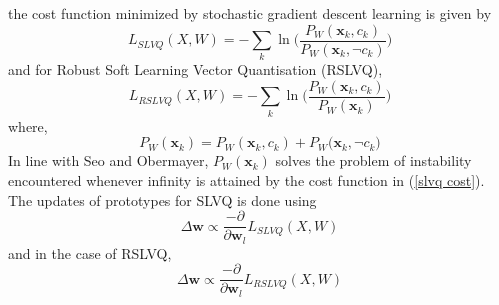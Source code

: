 the cost function minimized by stochastic gradient descent learning is given by
\begin{equation}\label{slvq cost}
	L_{SLVQ}(X,W) = -\sum_{k}\ln\bigg(\frac{P_{W}(\mathbf{x}_{k},c_{k})}{P_{W}(\mathbf{x}_{k},\neg c_{k})}\bigg)
\end{equation}
and for Robust Soft Learning Vector Quantisation (RSLVQ),
\begin{equation}\label{RSLVQ}
	L_{RSLVQ}(X,W) = -\sum_{k}\ln\bigg(\frac{P_{W}(\mathbf{x}_{k},c_{k})}{P_{W}(\mathbf{x}_{k})}\bigg)
\end{equation}
where,
\begin{equation}
	P_{W}(\mathbf{x}_{k}) = P_{W}(\mathbf{x}_{k},c_{k}) + P_{W}(\mathbf{x}_{k},\neg c_{k}\big)
\end{equation}
In line with Seo and Obermayer\cite{seo2003soft},\hspace{2pt} $P_{W}(\mathbf{x}_{k})$\hspace{2pt} solves the problem of instability encountered whenever infinity  is attained by the cost function in (\ref{slvq cost}).
The updates of prototypes for SLVQ is done using
\begin{equation*}
	\Delta \mathbf{w}\propto \frac{-\partial}{\partial \mathbf{w}_{l}}L_{SLVQ}(X,W) 
\end{equation*}
and in the case of RSLVQ,
\begin{equation*}
	\Delta \mathbf{w}\propto \frac{-\partial}{\partial \mathbf{w}_{l}}L_{RSLVQ}(X,W) 
\end{equation*}





